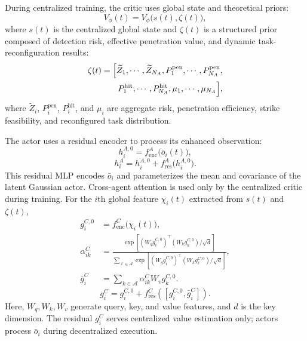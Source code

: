 \documentclass{cja}
\begin{document}
During centralized training, the critic uses global state and theoretical priors:
\begin{equation}
V_{\phi}(t)
=
V_{\phi}\bigl(s(t),\zeta(t)\bigr),
\end{equation}
where $s(t)$ is the centralized global state and $\zeta(t)$ is a structured prior composed of detection risk, effective penetration value, and dynamic task-reconfiguration results:
\begin{equation}
\begin{aligned}
\zeta(t)
=
\Bigl[
\widetilde Z_1,\cdots,\widetilde Z_{N_A},
P_1^{\mathrm{pen}},\cdots,P_{N_A}^{\mathrm{pen}},\\
P_1^{\mathrm{hit}},\cdots,P_{N_A}^{\mathrm{hit}},
\mu_1,\cdots,\mu_{N_A}
\Bigr],
\end{aligned}
\end{equation}
where $\widetilde Z_i$, $P_i^{\mathrm{pen}}$, $P_i^{\mathrm{hit}}$, and $\mu_i$ are aggregate risk, penetration efficiency, strike feasibility, and reconfigured task distribution.

The actor uses a residual encoder to process its enhanced observation:
\begin{equation}
h_i^{A,0}=f_{\mathrm{enc}}^{A}\bigl(\bar o_i(t)\bigr),
\end{equation}
\begin{equation}
h_i^{A}
=
h_i^{A,0}+f_{\mathrm{res}}^{A}\bigl(h_i^{A,0}\bigr).
\end{equation}
This residual MLP encodes $\bar o_i$ and parameterizes the mean and covariance of the latent Gaussian actor.
Cross-agent attention is used only by the centralized critic during training. For the $i$th global feature $\chi_i(t)$ extracted from $s(t)$ and $\zeta(t)$,
\begin{equation}
\begin{aligned}
g_i^{C,0}
&=f_{\mathrm{enc}}^{C}\bigl(\chi_i(t)\bigr),\\
\alpha_{ik}^{C}
&=
\frac{
\exp\left[(W_qg_i^{C,0})^{\top}(W_kg_k^{C,0})/\sqrt d\right]
}{
\sum_{\ell\in\mathcal A}
\exp\left[(W_qg_i^{C,0})^{\top}(W_kg_\ell^{C,0})/\sqrt d\right]
},\\
\bar g_i^{C}
&=\sum_{k\in\mathcal A}\alpha_{ik}^{C}W_vg_k^{C,0}.
\end{aligned}
\end{equation}
\begin{equation}
g_i^{C}
=
g_i^{C,0}
+f_{\mathrm{res}}^{C}\!\left([g_i^{C,0},\bar g_i^{C}]\right).
\end{equation}
Here, $W_q,W_k,W_v$ generate query, key, and value features, and $d$ is the key dimension. The residual $g_i^C$ serves centralized value estimation only; actors process $\bar o_i$ during decentralized execution.
\end{document}
